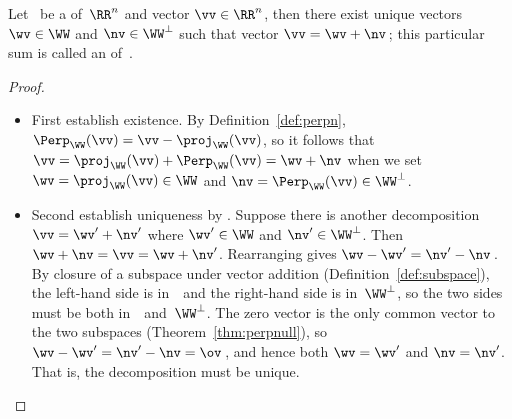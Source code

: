 \begin{theorem} \label{thm:odt}
Let \WW\ be a  of~\(\RR^n\) and vector \(\vv\in\RR^n\), then there exist unique vectors \(\wv\in\WW\) and \(\nv\in\WW^\perp\) such that vector \(\vv=\wv+\nv\)\,; this particular sum is called an  of~\vv.
\end{theorem}

\begin{proof} 
\begin{itemize}
\item First establish existence.  
By Definition~\ref{def:perpn}, \(\Perp_\WW(\vv)=\vv-\proj_\WW(\vv)\), so it follows that \(\vv=\proj_\WW(\vv)+\Perp_\WW(\vv)=\wv+\nv\) when we set \(\wv=\proj_\WW(\vv)\in\WW\) and \(\nv=\Perp_\WW(\vv)\in\WW^\perp\).

\item Second establish uniqueness by .
Suppose there is another decomposition \(\vv=\wv'+\nv'\) where \(\wv'\in\WW\) and \(\nv'\in\WW^\perp\).
Then \(\wv+\nv=\vv=\wv+\nv'\).
Rearranging gives \(\wv-\wv'=\nv'-\nv\)\,.
By closure of a subspace under vector addition (Definition~\ref{def:subspace}), the left-hand side is in~\WW\ and the right-hand side is in~\(\WW^\perp\), so the two sides must be both in~\WW\ and~\(\WW^\perp\).
The zero vector is the only common vector to the two subspaces (Theorem~\ref{thm:perpnull}), so \(\wv-\wv'=\nv'-\nv=\ov\)\,, and hence both \(\wv=\wv'\) and \(\nv=\nv'\).
That is, the decomposition must be unique.
\end{itemize}
\end{proof}



